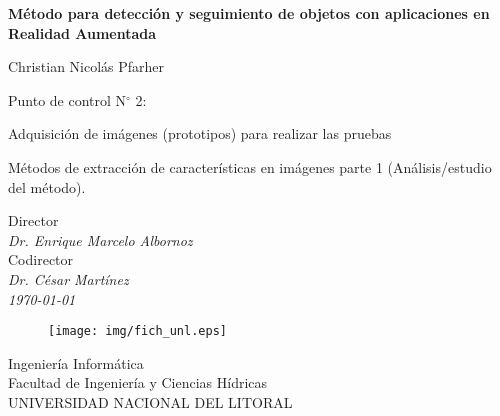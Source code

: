 \documentclass[a4paper,11pt,spanish]{article}
\begin{document}
\pagestyle{empty}


\begin{center}

	\bigskip
	\bigskip
	
	{\bf\Large Método para detección y seguimiento de objetos con aplicaciones en Realidad Aumentada} \\

	\bigskip
	\bigskip

	\large Christian Nicolás Pfarher\\


  	\bigskip
  	\bigskip
	
	Punto de control N$^{\circ}$ 2: \\	
		\begin{description}
			\item Adquisición de imágenes (prototipos) para realizar las pruebas		
			\item Métodos de extracción de características en imágenes parte 1 (Análisis/estudio del método).
		\end{description}

	 
	\bigskip
	
	Director\\
	\textit{Dr. Enrique Marcelo Albornoz}\\
	\bigskip
	Codirector\\
	\textit{Dr. César Martínez}\\
	
	\bigskip
	\bigskip
	\bigskip
	\bigskip
	\bigskip
	\bigskip
	\textit{\today}\\
	

	\vfill
	\begin{figure}[tbhp]
		\centerline{\texttt{[image: img/fich\_unl.eps]}}
	\end{figure}
	
  	{Ingeniería Informática}\\
  	{Facultad de Ingeniería y Ciencias Hídricas}\\
    {UNIVERSIDAD NACIONAL DEL LITORAL}	
\end{center}

\bigskip
\bigskip

\newpage
\end{document}
